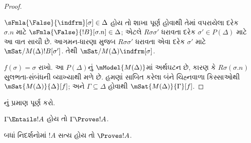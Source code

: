 \documentclass[../../../include/open-logic-section]{subfiles}
\begin{document}
\begin{proof}
\begin{enumerate}
{{      $\sFmla{\False}{\indfrm}[\sigma] \in \Delta$ હોય તો
      શાખા પૂર્ણ હોવાથી તેમાં વપરાયેલા દરેક $\sigma.n$ માટે
      $\sFmla{\False}{!B}[\sigma.n] \in \Delta$; એટલે
      $R\sigma\sigma'$ ધરાવતા દરેક
      $\sigma' \in P(\Delta)$ માટે આ વાત સાચી છે.
      આગમન-ધારણા મુજબ $R\sigma\sigma'$ ધરાવતા એવા દરેક
      $\sigma'$ માટે $\mSat/{M(\Delta)}{!B}[\sigma']$.
      તેથી $\mSat/{M(\Delta)}{\indfrm}[\sigma]$.}}
\end{enumerate}
$f(\sigma)=\sigma$ રાખો. આ $P(\Delta)$નું
$\mModel{M(\Delta)}$માં અર્થઘટન છે, કારણ કે
$R\sigma(\sigma.n)$ સુલભતા-સંબંધની વ્યાખ્યાથી મળે છે.
હમણાં સાબિત કરેલા બંને ચિહ્નવાળા કિસ્સાઓથી
$\mSat{M(\Delta)}{\Delta}[f]$; અને $\Gamma \subseteq \Delta$
હોવાથી $\mSat{M(\Delta)}{\Gamma}[f]$.
\end{proof}

\begin{prob}
નું પ્રમાણ પૂર્ણ કરો.
\end{prob}

\begin{cor}
$\Gamma \Entails !A$ હોય તો $\Gamma \Proves !A$.
\end{cor}

\begin{cor}
બધાં નિદર્શનોમાં $!A$ સત્ય હોય તો $\Proves !A$.
\end{cor}
\end{document}
